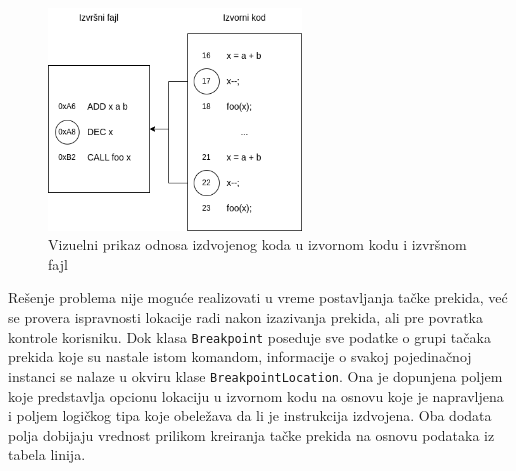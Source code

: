 \documentclass[12pt,oneside]{memoir}
\begin{document}
\begin{figure}[!ht]
  \centering
  \includegraphics[width=0.6\textwidth]{assets/outlining_breakpoint.png}
  \caption{Vizuelni prikaz odnosa izdvojenog koda u izvornom kodu i izvršnom fajl}
  \label{fig:outlined_breakpoint}
\end{figure}

Rešenje problema nije moguće realizovati u vreme postavljanja tačke prekida, već se provera ispravnosti lokacije radi nakon izazivanja prekida, ali pre povratka kontrole korisniku.
Dok klasa \verb|Breakpoint| poseduje sve podatke o grupi tačaka prekida koje su nastale istom komandom, informacije o svakoj pojedinačnoj instanci se nalaze u okviru klase \verb|BreakpointLocation|.
Ona je dopunjena poljem koje predstavlja opcionu lokaciju u izvornom kodu na osnovu koje je napravljena i poljem logičkog tipa koje obeležava da li je instrukcija izdvojena.
Oba dodata polja dobijaju vrednost prilikom kreiranja tačke prekida na osnovu podataka iz tabela linija.
\end{document}
